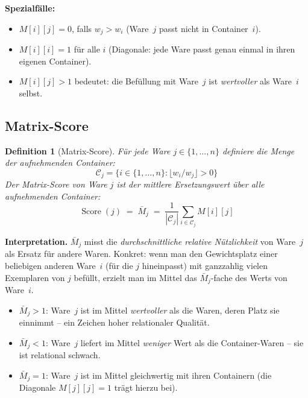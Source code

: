 \documentclass[a4paper,11pt]{article}
\newtheorem{definition}{Definition}
\begin{document}
\medskip
\noindent
\textbf{Spezialfälle:}
\begin{itemize}[leftmargin=*,topsep=2pt]
  \item $M[i][j] = 0$, falls $w_j > w_i$ (Ware~$j$ passt nicht
    in Container~$i$).
  \item $M[i][i] = 1$ für alle $i$ (Diagonale: jede Ware passt
    genau einmal in ihren eigenen Container).
  \item $M[i][j] > 1$ bedeutet: die Befüllung mit Ware~$j$ ist
    \emph{wertvoller} als Ware~$i$ selbst.
\end{itemize}

\subsection{Matrix-Score}

\begin{mdframed}[backgroundcolor=matlight,linecolor=matblue,linewidth=1.2pt]
\begin{definition}[Matrix-Score]
\label{def:score}
Für jede Ware $j \in \{1,\ldots,n\}$ definiere die Menge der
\emph{aufnehmenden Container}:
\[
\mathcal{C}_j = \bigl\{i \in \{1,\ldots,n\} :
  \lfloor w_i/w_j \rfloor > 0\bigr\}
\]
Der \emph{Matrix-Score} von Ware $j$ ist der mittlere
Ersetzungswert über alle aufnehmenden Container:
\[
\boxed{\;
\operatorname{Score}(j) \;=\; \bar{M}_j \;=\;
\frac{1}{|\mathcal{C}_j|}
\sum_{i \in \mathcal{C}_j} M[i][j]
\;}
\]
\end{definition}
\end{mdframed}

\medskip
\noindent
\textbf{Interpretation.}
$\bar{M}_j$ misst die \emph{durchschnittliche relative Nützlichkeit}
von Ware~$j$ als Ersatz für andere Waren. Konkret:
wenn man den Gewichtsplatz einer beliebigen anderen Ware~$i$
(für die $j$ hineinpasst) mit ganzzahlig vielen Exemplaren
von $j$ befüllt, erzielt man im Mittel das $\bar{M}_j$-fache
des Werts von Ware~$i$.

\begin{itemize}[leftmargin=*,topsep=4pt]
  \item $\bar{M}_j > 1$: Ware~$j$ ist im Mittel \emph{wertvoller}
    als die Waren, deren Platz sie einnimmt -- ein Zeichen
    hoher relationaler Qualität.
  \item $\bar{M}_j < 1$: Ware~$j$ liefert im Mittel \emph{weniger}
    Wert als die Container-Waren -- sie ist relational schwach.
  \item $\bar{M}_j = 1$: Ware~$j$ ist im Mittel gleichwertig mit
    ihren Containern (die Diagonale $M[j][j]=1$ trägt hierzu bei).
\end{itemize}
\end{document}
